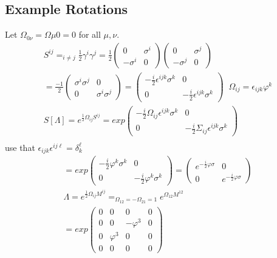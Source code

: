 \documentclass[]{scrartcl}
\begin{document}
\subsection{Example Rotations}
Let $\Omega_{0\nu} = \Omega{\mu0} = 0$ for all $\mu,\nu$.
\begin{gather}
	S^{ij} =_{i\neq j} \frac{1}{2}\gamma^i\gamma^j = \frac{1}{2}
	\begin{pmatrix}
		0 & \sigma^i\\ -\sigma^i & 0
	\end{pmatrix}
	\begin{pmatrix}
		0 & \sigma^j \\ -\sigma^j & 0
	\end{pmatrix}\\
	=
	\frac{-1}{2}
	\begin{pmatrix}
		\sigma^i\sigma^j & 0 \\ 0 & \sigma^i\sigma^j
	\end{pmatrix}
	=
	\begin{pmatrix}
		-\frac{i}{2}\epsilon^{ijk}\sigma^k & 0 \\ 0 & -\frac{i}{2}\epsilon^{ijk}\sigma^k
\end{pmatrix}\;\; \Omega_{ij} = \epsilon_{ijk}\varphi^k\\
S[\Lambda] =  e^{\frac{1}{2}\Omega_{ij}S^{ij}} = exp
\begin{pmatrix}
	-\frac{i}{2}\Omega_{ij}\epsilon^{ijk}\sigma^k & 0\\
	0 & -\frac{i}{2}\Sigma_{ij}\epsilon^{ijk}\sigma^k
\end{pmatrix}\\
\end{gather}
use that $\epsilon_{ijk}\epsilon^{ij\ell} = \delta^\ell_k$
\begin{gather}
= exp
\begin{pmatrix}
	-\frac{i}{2}\varphi^k \sigma^k & 0\\
	0 & -\frac{i}{2}\varphi^k\sigma^k
\end{pmatrix}
=
\begin{pmatrix}
	e^{-\frac{i}{2}\varphi\sigma} & 0\\
	0 & e^{-\frac{i}{2}\varphi\sigma}
\end{pmatrix}\\
\Lambda = e^{\frac{1}{2}\Omega_{ij}M^{ij}} = _{\Omega_{12} = -\Omega_{21} = 1} e^{\Omega_{12}M^{12}}\\
= exp
\begin{pmatrix}
	0 & 0 & 0 & 0\\
	0 & 0 & -\varphi^3 & 0\\
	0 & \varphi^3 & 0 & 0\\
	0 & 0 & 0 & 0
\end{pmatrix}
\end{gather}
\end{document}

